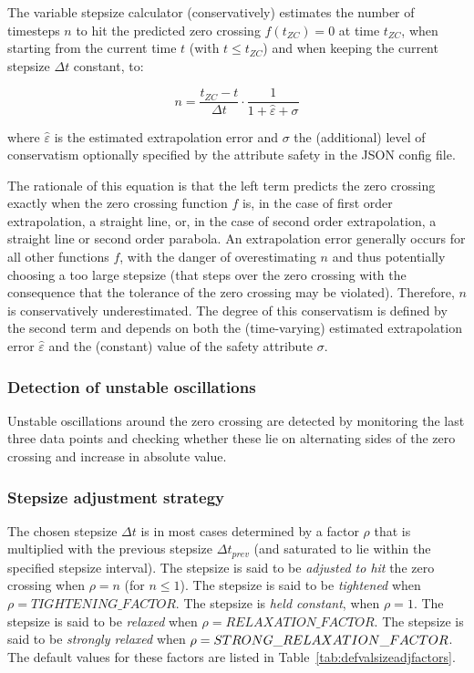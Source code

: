 The variable stepsize calculator (conservatively) estimates the number of timesteps $n$ to hit the predicted zero crossing $f(t_{ZC}) = 0$ at time $t_{ZC}$, when starting from the current time $t$ (with $t \leq t_{ZC}$) and when keeping the current stepsize $\Delta t$ constant, to:

\begin{equation}
n = \frac{t_{ZC} - t}{\Delta t}\cdot \frac{1}{1+\hat{\varepsilon} + \sigma}
\end{equation}

\noindent where $\hat{\varepsilon}$ is the estimated extrapolation error and $\sigma$ the (additional) level of conservatism optionally specified by the attribute {\ttfamily safety} in the JSON config file.

\noindent The rationale of this equation is that the left term predicts the zero crossing exactly when the zero crossing function $f$ is, in the case of first order extrapolation, a straight line, or, in the case of second order extrapolation, a straight line or second order parabola. An extrapolation error generally occurs for all other functions $f$, with the danger of overestimating $n$ and thus potentially choosing a too large stepsize (that steps over the zero crossing with the consequence that the tolerance of the zero crossing may be violated). Therefore, $n$ is conservatively underestimated. The degree of this conservatism is defined by the second term and depends on both the (time-varying) estimated extrapolation error $\hat{\varepsilon}$ and the (constant) value of the safety attribute $\sigma$.

\subsubsection{Detection of unstable oscillations}

Unstable oscillations around the zero crossing are detected by monitoring the last three data points and checking whether these lie on alternating sides of the zero crossing and increase in absolute value.

\subsubsection{Stepsize adjustment strategy}\label{sec:sizeadjstrat}

The chosen stepsize $\Delta t$ is in most cases determined by a factor $\rho$ that is multiplied with the previous stepsize $\Delta t_{prev}$ (and saturated to lie within the specified stepsize interval). The stepsize is said to be \textit{adjusted to hit} the zero crossing when $\rho = n$ (for $n \leq 1$). The stepsize is said to be \textit{tightened} when $\rho = TIGHTENING\_FACTOR$. The stepsize is \textit{held constant}, when $\rho = 1$. The stepsize is said to be \textit{relaxed} when $\rho = RELAXATION\_FACTOR$. The stepsize is said to be \textit{strongly relaxed} when $\rho = STRONG\_\-RE\-LA\-XA\-TION\_\-FACTOR$. The default values for these factors are listed in Table~\ref{tab:defvalsizeadjfactors}.

